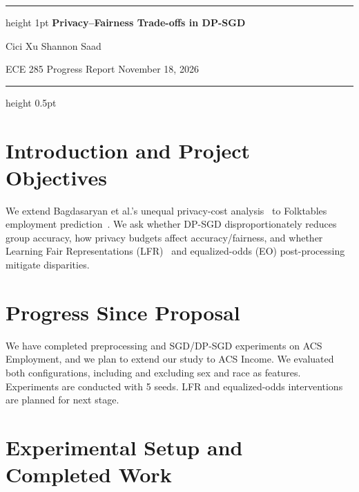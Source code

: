 \documentclass[11pt,letterpaper]{article}
\begin{document}
\vspace*{-0.4in}
\begin{center}
\hrule height 1pt
{\large\bfseries Privacy--Fairness Trade-offs in DP-SGD}\par
\vspace{3pt}
Cici Xu \qquad Shannon Saad\par
ECE 285 Progress Report \quad November 18, 2026
\vspace{4pt}\hrule height 0.5pt
\end{center}
\vspace{-4pt}

\section{Introduction and Project Objectives}
We extend Bagdasaryan et al.'s unequal privacy-cost analysis~\cite{bagdasaryan2019} to Folktables
employment prediction~\cite{ding2021}. We ask whether DP-SGD disproportionately reduces group accuracy,
how privacy budgets affect accuracy/fairness, and whether Learning Fair Representations
(LFR)~\cite{zemel2013} and equalized-odds (EO) post-processing~\cite{hardt2016} mitigate disparities.

\section{Progress Since Proposal}
We have completed preprocessing and SGD/DP-SGD experiments on ACS Employment, and we plan to extend our study to ACS Income. We evaluated both configurations, including and excluding sex and race as features. Experiments are conducted with 5 seeds. LFR and equalized-odds interventions are planned for next stage.

\section{Experimental Setup and Completed Work}
\end{document}
